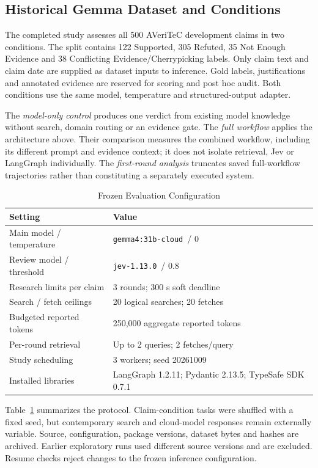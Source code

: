 \documentclass[conference]{IEEEtran}
\newcommand{\modelname}{\texttt{gemma4:31b-cloud}}
\newcommand{\jevname}{\texttt{jev-1.13.0}}
\begin{document}
\subsection{Historical Gemma Dataset and Conditions}
The completed study assesses all 500 AVeriTeC development claims in two conditions. The split contains 122 Supported, 305 Refuted, 35 Not Enough Evidence and 38 Conflicting Evidence/Cherrypicking labels. Only claim text and claim date are supplied as dataset inputs to inference. Gold labels, justifications and annotated evidence are reserved for scoring and post hoc audit. Both conditions use the same model, temperature and structured-output adapter.

The \emph{model-only control} produces one verdict from existing model knowledge without search, domain routing or an evidence gate. The \emph{full workflow} applies the architecture above. Their comparison measures the combined workflow, including its different prompt and evidence context; it does not isolate retrieval, Jev or LangGraph individually. The \emph{first-round analysis} truncates saved full-workflow trajectories rather than constituting a separately executed system.

\begin{table}[t]
\caption{Frozen Evaluation Configuration}
\label{tab:protocol}
\centering
\footnotesize
\begin{tabular}{@{}p{}p{}@{}}
\toprule
Setting & Value\\
\midrule
Main model / temperature & \modelname\ / 0\\
Review model / threshold & \jevname\ / 0.8\\
Research limits per claim & 3 rounds; 300 s soft deadline\\
Search / fetch ceilings & 20 logical searches; 20 fetches\\
Budgeted reported tokens & 250,000 aggregate reported tokens\\
Per-round retrieval & Up to 2 queries; 2 fetches/query\\
Study scheduling & 3 workers; seed 20261009\\
Installed libraries & LangGraph 1.2.11; Pydantic 2.13.5; TypeSafe SDK 0.7.1\\
\bottomrule
\end{tabular}
\end{table}

Table~\ref{tab:protocol} summarizes the protocol. Claim-condition tasks were shuffled with a fixed seed, but contemporary search and cloud-model responses remain externally variable. Source, configuration, package versions, dataset bytes and hashes are archived. Earlier exploratory runs used different source versions and are excluded. Resume checks reject changes to the frozen inference configuration.
\end{document}
